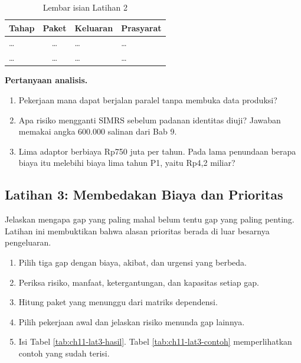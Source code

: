 \begin{table}[!htb]
  \centering
  \caption{Lembar isian Latihan 2}
  \label{tab:ch11-lat2-hasil}
  \small
  \begin{tabularx}{\textwidth}{>{\raggedright\arraybackslash}p{2.9cm}c>{\raggedright\arraybackslash}X>{\raggedright\arraybackslash}X}
    \hline
    \textbf{Tahap} & \textbf{Paket} & \textbf{Keluaran} & \textbf{Prasyarat} \\ \hline
    \dots & \dots & \dots & \dots \\ \hline
    \dots & \dots & \dots & \dots \\ \hline
  \end{tabularx}
\end{table}

\textbf{Pertanyaan analisis.}
\begin{enumerate}
  \item Pekerjaan mana dapat berjalan paralel tanpa membuka data produksi?
  \item Apa risiko mengganti SIMRS sebelum padanan identitas diuji? Jawaban memakai angka 600.000 salinan dari Bab 9.
  \item Lima adaptor berbiaya Rp750 juta per tahun. Pada lama penundaan berapa biaya itu melebihi biaya lima tahun P1, yaitu Rp4,2 miliar?
\end{enumerate}

\subsection*{Latihan 3: Membedakan Biaya dan Prioritas}

Jelaskan mengapa gap yang paling mahal belum tentu gap yang paling penting. Latihan ini membuktikan bahwa alasan prioritas berada di luar besarnya pengeluaran.

\begin{enumerate}
  \item Pilih tiga gap dengan biaya, akibat, dan urgensi yang berbeda.
  \item Periksa risiko, manfaat, ketergantungan, dan kapasitas setiap gap.
  \item Hitung paket yang menunggu dari matriks dependensi.
  \item Pilih pekerjaan awal dan jelaskan risiko menunda gap lainnya.
  \item Isi Tabel \ref{tab:ch11-lat3-hasil}. Tabel \ref{tab:ch11-lat3-contoh} memperlihatkan contoh yang sudah terisi.
\end{enumerate}

